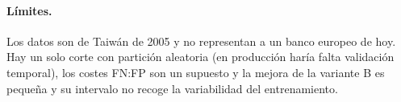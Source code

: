 \documentclass[10pt,a4paper]{article}
\begin{document}
\paragraph{Límites.} Los datos son de Taiwán de 2005 y no representan a un banco europeo de hoy. Hay un solo corte con partición aleatoria (en producción haría falta validación temporal), los costes FN:FP son un supuesto y la mejora de la variante B es pequeña y su intervalo no recoge la variabilidad del entrenamiento.


\FloatBarrier


\end{document}

